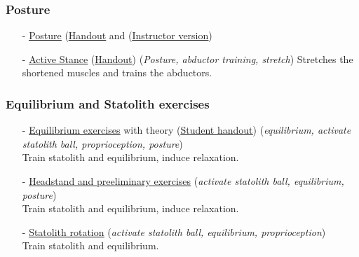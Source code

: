 \begin{frame}
\frametitle{Posture}
\begin{itemize}
\item[-] \href{run:./Posture.pdf}{\underline{Posture}}
(\href{run:./Posture_Handout.pdf}{\underline{Handout}}
and 
(\href{run:./Posture_wNotes.pdf}{\underline{Instructor version}})  
\item[-] 
\href{run:./Active_Stance.pdf}{\underline{Active Stance}}
(\href{run:./Active_Stance_Handout.pdf}{\underline{Handout}}) 
(\textit{Posture, abductor training, stretch})
Stretches the shortened muscles and trains the abductors.


\end{itemize}
\end{frame}
\begin{frame}
\frametitle{Equilibrium and Statolith exercises}
\begin{itemize}
\item[-] \href{run:./Equilibrium_Exercises.pdf}{\underline{Equilibrium exercises}} 
with theory
(\href{run:./Equilibrium_Exercises_Handout.pdf}{\underline{Student handout}})
 (\textit{equilibrium, activate statolith ball, proprioception, posture})\\
Train statolith and equilibrium, induce relaxation.


\item[-] \href{run:./Headstand.pdf}{\underline{Headstand and preeliminary exercises}} 
 (\textit{activate statolith ball, equilibrium, posture})\\
Train statolith and equilibrium, induce relaxation.

\item[-] \href{run:./Statolith_rotation.pdf}{\underline{Statolith rotation}} 
 (\textit{activate statolith ball, equilibrium, proprioception})\\
Train statolith and equilibrium.
\end{itemize}
\end{frame}
